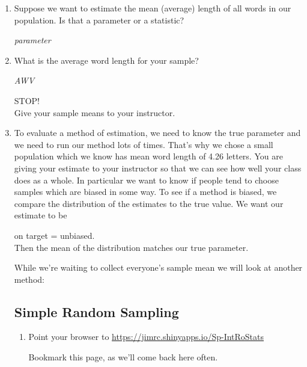 \begin{enumerate}
\item Suppose we want to estimate the mean (average) length of all
  words in our population. Is that a parameter or a statistic?
\begin{students}
  \vspace{1cm}
\end{students}    
\begin{key}
   {\it parameter}
\end{key}
\item What is the average word length for your sample?
\begin{students}
  \vspace{1cm}
\end{students}    
\begin{key}
   {\it AWV}
\end{key}

  \begin{center}
    {\LARGE STOP!}\\
Give your sample means to your instructor.
  \end{center}

\item To evaluate a method of estimation, we need to know the true
  parameter and we need to run our method lots of times.  That's why we
  chose a small population which we know has mean word length of 4.26
  letters. You are giving your estimate to your instructor so that we
  can see how well your class does as a whole.  In particular we want
  to know if people tend to choose samples which are biased in some
  way. To see if a method is biased, we compare the distribution of
  the estimates to the true value.  We want our estimate to be
  \begin{center}
    {\large on target = unbiased.}\\
  Then the mean of the distribution matches our true parameter.
  \end{center}
  While we're waiting to collect everyone's sample mean we will look
  at another method:
 
    \subsection{ Simple Random Sampling}
 
  \begin{enumerate}
    \item Point your browser to \url{https://jimrc.shinyapps.io/Sp-IntRoStats}

 Bookmark this page, as we'll come back here often.  


\end{enumerate}
\end{enumerate}
